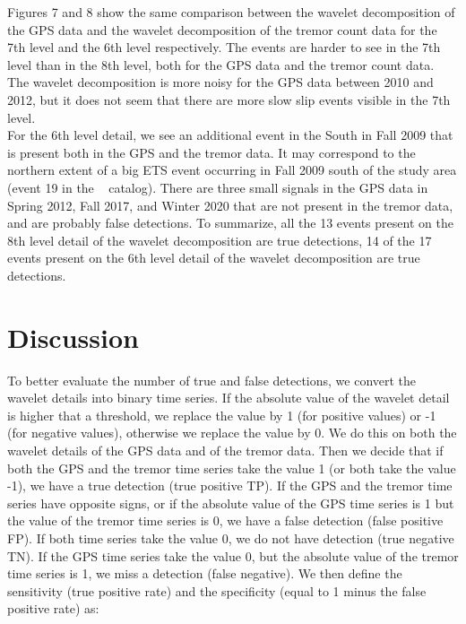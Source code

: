 \documentclass{article}
\begin{document}
Figures 7 and 8 show the same comparison between the wavelet decomposition of the GPS data and the wavelet decomposition of the tremor count data for the 7th level and the 6th level respectively. The events are harder to see in the 7th level than in the 8th level, both for the GPS data and the tremor count data. The wavelet decomposition is more noisy for the GPS data between 2010 and 2012, but it does not seem that there are more slow slip events visible in the 7th level. \\

For the 6th level detail, we see an additional event in the South in Fall 2009 that is present both in the GPS and the tremor data. It may correspond to the northern extent of a big ETS event occurring in Fall 2009 south of the study area (event 19 in the ~\citet{MIC_2019} catalog). There are three small signals in the GPS data in Spring 2012, Fall 2017, and Winter 2020 that are not present in the tremor data, and are probably false detections. To summarize, all the 13 events present on the 8th level detail of the wavelet decomposition are true detections, 14 of the 17 events present on the 6th level detail of the wavelet decomposition are true detections. \\

\section{Discussion}

To better evaluate the number of true and false detections, we convert the wavelet details into binary time series. If the absolute value of the wavelet detail is higher that a threshold, we replace the value by 1 (for positive values) or -1 (for negative values), otherwise we replace the value by 0. We do this on both the wavelet details of the GPS data and of the tremor data. Then we decide that if both the GPS and the tremor time series take the value 1 (or both take the value -1), we have a true detection (true positive TP). If the GPS and the tremor time series have opposite signs, or if the absolute value of the GPS time series is 1 but the value of the tremor time series is 0, we have a false detection (false positive FP). If both time series take the value 0, we do not have detection (true negative TN). If the GPS time series take the value 0, but the absolute value of the tremor time series is 1, we miss a detection (false negative). We then define the sensitivity (true positive rate) and the specificity (equal to 1 minus the false positive rate) as:
\end{document}
